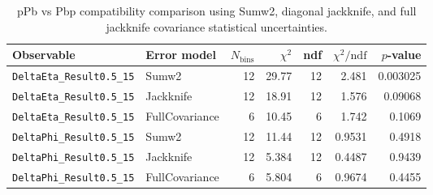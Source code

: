 \begin{table}[htbp]
\centering
\begin{tabular}{|l|l|r|r|r|r|r|}
\hline
Observable & Error model & $N_{\mathrm{bins}}$ & $\chi^2$ & ndf & $\chi^2/\mathrm{ndf}$ & $p$-value \\
\hline
\texttt{DeltaEta_Result0.5_15} & Sumw2 & 12 & 29.77 & 12 & 2.481 & 0.003025 \\
\texttt{DeltaEta_Result0.5_15} & Jackknife & 12 & 18.91 & 12 & 1.576 & 0.09068 \\
\texttt{DeltaEta_Result0.5_15} & FullCovariance & 6 & 10.45 & 6 & 1.742 & 0.1069 \\
\texttt{DeltaPhi_Result0.5_15} & Sumw2 & 12 & 11.44 & 12 & 0.9531 & 0.4918 \\
\texttt{DeltaPhi_Result0.5_15} & Jackknife & 12 & 5.384 & 12 & 0.4487 & 0.9439 \\
\texttt{DeltaPhi_Result0.5_15} & FullCovariance & 6 & 5.804 & 6 & 0.9674 & 0.4455 \\
\hline
\end{tabular}
\caption{pPb vs Pbp compatibility comparison using Sumw2, diagonal jackknife, and full jackknife covariance statistical uncertainties.}
\label{tab:ppbp-compatibility}
\end{table}
